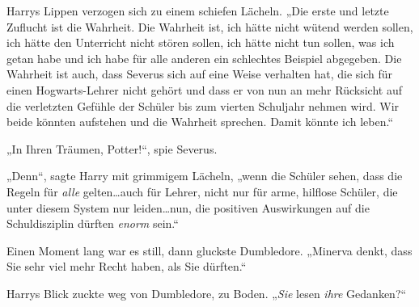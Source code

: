 Harrys Lippen verzogen sich zu einem schiefen Lächeln. „Die erste und letzte Zuflucht ist die Wahrheit. Die Wahrheit ist, ich hätte nicht wütend werden sollen, ich hätte den Unterricht nicht stören sollen, ich hätte nicht tun sollen, was ich getan habe und ich habe für alle anderen ein schlechtes Beispiel abgegeben. Die Wahrheit ist auch, dass Severus sich auf eine Weise verhalten hat, die sich für einen Hogwarts-Lehrer nicht gehört und dass er von nun an mehr Rücksicht auf die verletzten Gefühle der Schüler bis zum vierten Schuljahr nehmen wird. Wir beide könnten aufstehen und die Wahrheit sprechen. Damit könnte ich leben.“

„In Ihren Träumen, Potter!“, spie Severus.

„Denn“, sagte Harry mit grimmigem Lächeln, „wenn die Schüler sehen, dass die Regeln für \emph{alle} gelten…auch für Lehrer, nicht nur für arme, hilflose Schüler, die unter diesem System nur leiden…nun, die positiven Auswirkungen auf die Schuldisziplin dürften \emph{enorm} sein.“

Einen Moment lang war es still, dann gluckste Dumbledore. „Minerva denkt, dass Sie sehr viel mehr Recht haben, als Sie dürften.“

Harrys Blick zuckte weg von Dumbledore, zu Boden. „\emph{Sie} lesen \emph{ihre} Gedanken?“

